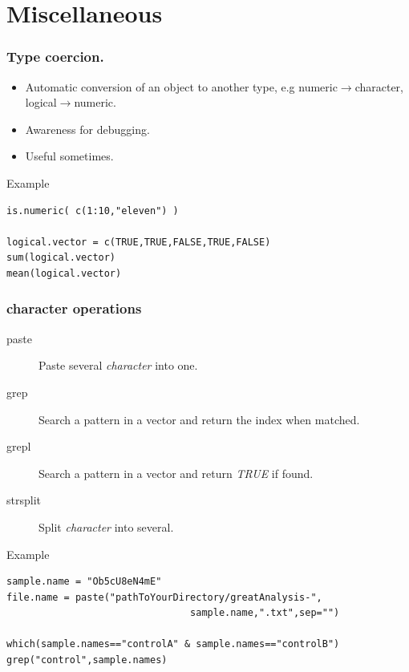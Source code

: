 \documentclass[10pt]{beamer}
\newenvironment{xframe}[2][]
  {\begin{frame}[fragile,environment=xframe,#1]
  \frametitle{#2}}
  {\end{frame}}
\begin{document}



\section{Miscellaneous}

\begin{xframe}{Type coercion.}
  \begin{block}{}
    \begin{itemize}
    \item Automatic conversion of an object to another type, e.g {\sf numeric}$\rightarrow${\sf character}, {\sf logical}$\rightarrow${\sf numeric}.
    \item Awareness for debugging.
    \item Useful sometimes.
    \end{itemize}
  \end{block}
  \begin{exampleblock}{Example}
\begin{verbatim}
is.numeric( c(1:10,"eleven") )

logical.vector = c(TRUE,TRUE,FALSE,TRUE,FALSE)
sum(logical.vector)
mean(logical.vector)
\end{verbatim}  
  \end{exampleblock}
\end{xframe}


\begin{xframe}{{\sf character} operations}
  \begin{block}{}
    \begin{description}
      \item[paste] Paste several {\it character} into one.
      \item[grep] Search a pattern in a {\sf vector} and return the index when matched.
      \item[grepl] Search a pattern in a {\sf vector} and return {\it TRUE} if found.
      \item[strsplit] Split {\it character} into several.
    \end{description}
  \end{block}
  \begin{exampleblock}{Example}
\begin{verbatim}
sample.name = "Ob5cU8eN4mE"
file.name = paste("pathToYourDirectory/greatAnalysis-",
                                sample.name,".txt",sep="")

which(sample.names=="controlA" & sample.names=="controlB")
grep("control",sample.names)
\end{verbatim}  
  \end{exampleblock}
\end{xframe}
\end{document}
